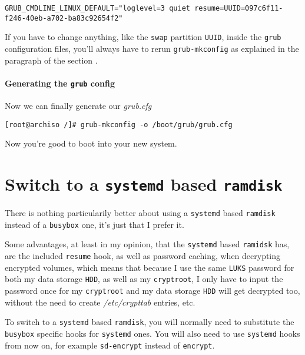 \documentclass[10pt]{dustdoc}
\begin{document}
\begin{verbatim}
GRUB_CMDLINE_LINUX_DEFAULT="loglevel=3 quiet resume=UUID=097c6f11-f246-40eb-a702-ba83c92654f2"
\end{verbatim}

\begin{NOTE}
    If you have to change anything, like the \texttt{swap} partition \texttt{UUID}, inside the \texttt{grub} configuration files, you’ll always have to rerun \texttt{grub-mkconfig} as explained in the paragraph  of the section .
\end{NOTE}

\paragraph{Generating the \texttt{grub} config}
\label{par:generating-the-grub-config}

Now we can finally generate our \textit{grub.cfg}

\begin{verbatim}
[root@archiso /]# grub-mkconfig -o /boot/grub/grub.cfg
\end{verbatim}

Now you’re good to boot into your new system.

\section{Switch to a \texttt{systemd} based \texttt{ramdisk}}
\label{sec:switch-to-a-systemd-based-ramdisk}

\begin{NOTE}
    There is nothing particularily better about using a \texttt{systemd} based \texttt{ramdisk} instead of a \texttt{busybox} one, it’s just that I prefer it.

    Some advantages, at least in my opinion, that the \texttt{systemd} based \texttt{ramidsk} has, are the included \texttt{resume} hook, as well as password caching, when decrypting encrypted volumes, which means that because I use the same \texttt{LUKS} password for both my data storage \texttt{HDD}, as well as my \texttt{cryptroot}, I only have to input the password once for my \texttt{cryptroot} and my data storage \texttt{HDD} will get decrypted too, without the need to create \textit{/etc/crypttab} entries, etc.
\end{NOTE}

To switch to a \texttt{systemd} based \texttt{ramdisk}, you will normally need to substitute the \texttt{busybox} specific hooks for \texttt{systemd} ones.
You will also need to use \texttt{systemd} hooks from now on, for example \texttt{sd-encrypt} instead of \texttt{encrypt}.
\end{document}
